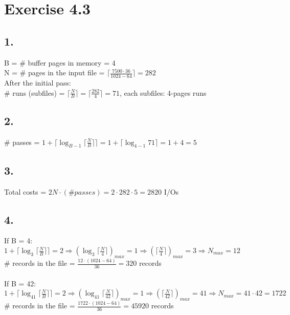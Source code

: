 \documentclass[12pt]{article}
\begin{document}
	
	\section*{Exercise 4.3}
	\subsection*{1.}
	B = \# buffer pages in memory  = 4 \\
	N = \# pages in the input file = $\lceil\frac{7500\cdot 36}{1024-64}\rceil = 282$ \\
	After the initial pass:\\
	\# runs (subfiles) = $\lceil\frac{N}{B}\rceil = \lceil\frac{282}{4}\rceil= 71$, each subfiles: 4-pages runs\\
	
	\subsection*{2.}
	\# passes = $1+ \lceil \log_{B-1}{ \lceil\frac{N}{B}\rceil }\rceil=1+ \lceil \log_{4-1}{ 71 }\rceil=1+4 = 5$\\
	
	\subsection*{3.}
	Total costs = $2N\cdot (\# passes) = 2\cdot 282\cdot 5 = 2820$ I/Os\\
	
	\subsection*{4.}
	If B = 4:\\
	$1+ \lceil \log_{3}{ \lceil\frac{N}{B}\rceil }\rceil=2\Rightarrow (\log_3{\lceil\frac{N}{4}\rceil})_{max}=1\Rightarrow (\lceil\frac{N}{4}\rceil)_{max}=3 \Rightarrow N_{max}=12$\\
	\# records in the file = $\frac{12\cdot (1024-64)}{36}= 320$ records \\
	\\
	If B = 42:\\
	$1+ \lceil \log_{41}{ \lceil\frac{N}{B}\rceil }\rceil=2\Rightarrow (\log_41{\lceil\frac{N}{42}\rceil})_{max}=1\Rightarrow (\lceil\frac{N}{42}\rceil)_{max}=41 \Rightarrow N_{max}=41\cdot 42 = 1722$\\
	\# records in the file = $\frac{1722\cdot (1024-64)}{36}= 45920$ records \\
\end{document}
